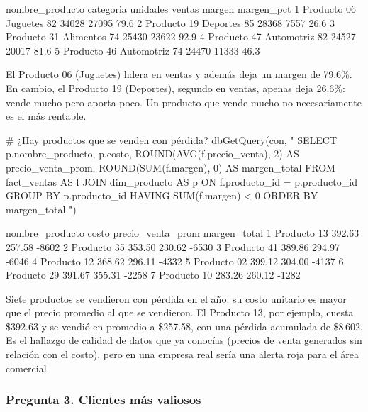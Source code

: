 \begin{rsalida}
  nombre_producto  categoria unidades ventas margen margen_pct
1     Producto 06   Juguetes       82  34028  27095       79.6
2     Producto 19   Deportes       85  28368   7557       26.6
3     Producto 31  Alimentos       74  25430  23622       92.9
4     Producto 47 Automotriz       82  24527  20017       81.6
5     Producto 46 Automotriz       74  24470  11333       46.3
\end{rsalida}

El Producto 06 (Juguetes) lidera en ventas y además deja un margen de
79.6\%. En cambio, el Producto 19 (Deportes), segundo en ventas, apenas
deja 26.6\%: vende mucho pero aporta poco. Un producto que vende mucho no
necesariamente es el más rentable.

\begin{rcode}
# ¿Hay productos que se venden con pérdida?
dbGetQuery(con, "
  SELECT p.nombre_producto, p.costo,
         ROUND(AVG(f.precio_venta), 2) AS precio_venta_prom,
         ROUND(SUM(f.margen), 0)       AS margen_total
  FROM fact_ventas AS f
  JOIN dim_producto AS p ON f.producto_id = p.producto_id
  GROUP BY p.producto_id
  HAVING SUM(f.margen) < 0
  ORDER BY margen_total
")
\end{rcode}

\begin{rsalida}
  nombre_producto  costo precio_venta_prom margen_total
1     Producto 13 392.63            257.58        -8602
2     Producto 35 353.50            230.62        -6530
3     Producto 41 389.86            294.97        -6046
4     Producto 12 368.62            296.11        -4332
5     Producto 02 399.12            304.00        -4137
6     Producto 29 391.67            355.31        -2258
7     Producto 10 283.26            260.12        -1282
\end{rsalida}

Siete productos se vendieron con pérdida en el año: su costo unitario es
mayor que el precio promedio al que se vendieron. El Producto 13, por
ejemplo, cuesta \$392.63 y se vendió en promedio a \$257.58, con una
pérdida acumulada de \$8\,602. Es el hallazgo de calidad de datos que ya
conocías (precios de venta generados sin relación con el costo), pero en
una empresa real sería una alerta roja para el área comercial.

\subsubsection{Pregunta 3. Clientes más valiosos}

